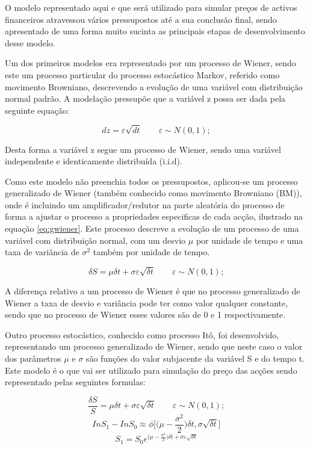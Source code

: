 \documentclass[
  12pt,
  a4paper,
  openany]{book}
\begin{document}
O modelo representado aqui e que será utilizado para simular preços de activos financeiros atravessou vários pressupostos até a sua conclusão final, sendo apresentado de uma forma muito sucinta as principais etapas de desenvolvimento desse modelo.

Um dos primeiros modelos era representado por um processo de Wiener, sendo este um processo particular do processo estocástico Markov, referido como movimento Browniano, descrevendo a evolução de uma variável com distribuição normal padrão. A modelação pressupõe que a variável z possa ser dada pela seguinte equação:

\begin{equation} 
  dz = \varepsilon \sqrt{dt}\qquad   \varepsilon \sim N(0,1);
  \label{eq:wiener}
\end{equation}

Desta forma a variável z segue um processo de Wiener, sendo uma variável independente e identicamente distribuída (i.i.d).

Como este modelo não preenchia todos os pressupostos, aplicou-se um processo generalizado de Wiener (também conhecido como movimento Browniano (BM)), onde é incluindo um amplificador/redutor na parte aleatória do processo de forma a ajustar o processo a propriedades especificas de cada acção, ilustrado na equação \eqref{eq:gwiener}. Este processo descreve a evolução de um processo de uma variável com distribuição normal, com um desvio \(\mu\) por unidade de tempo e uma taxa de variância de \(\sigma^2\) também por unidade de tempo.

\begin{equation} 
  \delta S = \mu\delta t +\sigma\varepsilon\sqrt{\delta t}\qquad\varepsilon \sim N(0,1);
  \label{eq:gwiener}
\end{equation}

A diferença relativo a um processo de Wiener é que no processo generalizado de Wiener a taxa de desvio e variância pode ter como valor qualquer constante, sendo que no processo de Wiener esses valores são de 0 e 1 respectivamente.

Outro processo estocástico, conhecido como processo Itô, foi desenvolvido, representando um processo generalizado de Wiener, sendo que neste caso o valor dos parâmetros \(\mu\) e \(\sigma\) são funções do valor subjacente da variável S e do tempo t. Este modelo é o que vai ser utilizado para simulação do preço das acções sendo representado pelas seguintes formulas:

\begin{equation} 
  \frac{\delta S}{S} = \mu\delta t +\sigma\varepsilon\sqrt{\delta t}\qquad\varepsilon \sim N(0,1);
  \label{eq:ito}
\end{equation}
\begin{equation} 
  In S_1 - InS_0 \approx\phi\Big[\Big(\mu-\frac{\sigma^2}{2}\Big)\delta t, \sigma\sqrt{\delta t}\Big]
  \label{eq:Inito}
\end{equation}
\begin{equation} 
  S_1 =S_0 e^{\Big(\mu-\frac{\sigma^2}{2}\Big)\delta t + \sigma\varepsilon\sqrt{\delta t}}
  \label{eq:logprice}
\end{equation}
\end{document}
